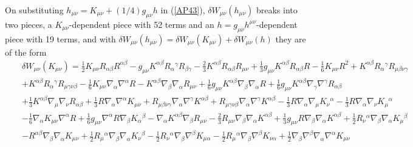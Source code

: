 \documentclass[aps]{revtex4}
\begin{document}
On substituting $h_{\mu\nu}=K_{\mu\nu}+(1/4)g_{\mu\nu}h$ in (\ref{AP43}), $\delta W_{\mu\nu}(h_{\mu\nu})$ breaks into two pieces, a $K_{\mu\nu}$-dependent piece with 52 terms and an $h=g_{\mu\nu}h^{\mu\nu}$-dependent piece with 19 terms, and with $\delta W_{\mu\nu}(h_{\mu\nu})=\delta W_{\mu\nu}(K_{\mu\nu})+\delta W_{\mu\nu}(h)$ they are of the form 
%
\begin{eqnarray}
&&\delta W_{\mu\nu}(K_{\mu\nu})=\tfrac{1}{2} K_{\mu \nu} R_{\alpha \beta} R^{\alpha \beta} -  g_{\mu \nu} K^{\alpha \beta} R_{\alpha}{}^{\gamma} R_{\beta \gamma} -  \tfrac{2}{3} K^{\alpha \beta} R_{\alpha \beta} R_{\mu \nu} + \tfrac{1}{3} g_{\mu \nu} K^{\alpha \beta} R_{\alpha \beta} R -  \tfrac{1}{6} K_{\mu \nu} R^2 
+ K^{\alpha \beta} R_{\alpha}{}^{\gamma} R_{\mu \beta \nu \gamma} 
\nonumber\\
&&+ K^{\alpha \beta} R_{\alpha}{}^{\gamma} R_{\mu \gamma \nu \beta} -  \tfrac{1}{6} K_{\mu \nu} \nabla_{\alpha}\nabla^{\alpha}R -  K^{\alpha \beta} \nabla_{\beta}\nabla_{\alpha}R_{\mu \nu} + \tfrac{1}{6} g_{\mu \nu} K^{\alpha \beta} \nabla_{\beta}\nabla_{\alpha}R + \tfrac{1}{6} g_{\mu \nu} K^{\alpha \beta} \nabla_{\gamma}\nabla^{\gamma}R_{\alpha \beta} 
\nonumber\\
&&+ \tfrac{1}{3} K^{\alpha \beta} \nabla_{\mu}\nabla_{\nu}R_{\alpha \beta}
+\tfrac{1}{3} R \nabla_{\alpha}\nabla^{\alpha}K_{\mu \nu} + R_{\mu \beta \nu \gamma} \nabla_{\alpha}\nabla^{\gamma}K^{\alpha \beta} + R_{\mu \gamma \nu \beta} \nabla_{\alpha}\nabla^{\gamma}K^{\alpha \beta} -  \tfrac{1}{3} R \nabla_{\alpha}\nabla_{\mu}K_{\nu}{}^{\alpha} -  \tfrac{1}{3} R \nabla_{\alpha}\nabla_{\nu}K_{\mu}{}^{\alpha} 
\nonumber\\
&&-  \tfrac{1}{6} \nabla_{\alpha}K_{\mu \nu} \nabla^{\alpha}R 
+ \tfrac{1}{6} g_{\mu \nu} \nabla^{\alpha}R \nabla_{\beta}K_{\alpha}{}^{\beta} -  \nabla_{\alpha}K^{\alpha \beta} \nabla_{\beta}R_{\mu \nu} -  \tfrac{2}{3} R_{\mu \nu} \nabla_{\beta}\nabla_{\alpha}K^{\alpha \beta} + \tfrac{1}{3} g_{\mu \nu} R \nabla_{\beta}\nabla_{\alpha}K^{\alpha \beta} + \tfrac{1}{2} R_{\nu}{}^{\alpha} \nabla_{\beta}\nabla_{\alpha}K_{\mu}{}^{\beta} 
\nonumber\\
&&-  R^{\alpha \beta} \nabla_{\beta}\nabla_{\alpha}K_{\mu \nu} 
+ \tfrac{1}{2} R_{\mu}{}^{\alpha} \nabla_{\beta}\nabla_{\alpha}K_{\nu}{}^{\beta} -  \tfrac{1}{2} R_{\nu}{}^{\alpha} \nabla_{\beta}\nabla^{\beta}K_{\mu \alpha} -  \tfrac{1}{2} R_{\mu}{}^{\alpha} \nabla_{\beta}\nabla^{\beta}K_{\nu \alpha} + \tfrac{1}{2} \nabla_{\beta}\nabla^{\beta}\nabla_{\alpha}\nabla^{\alpha}K_{\mu \nu} 
\nonumber\\

\end{eqnarray}
\end{document}
